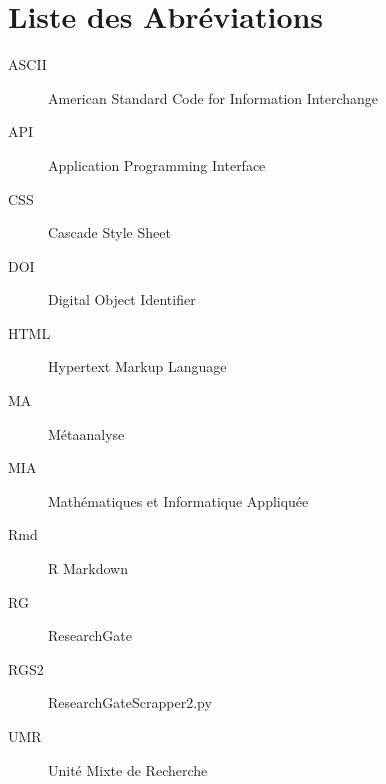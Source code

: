 \documentclass{book}
\begin{document}
\newpage
\mbox{} %


\newpage
{}
\chapter*{Liste des Abréviations}

\begin{description}
    \item[ASCII] American Standard Code for Information Interchange
    \item[API] Application Programming Interface
    \item[CSS] Cascade Style Sheet
    \item[DOI] Digital Object Identifier
    \item[HTML] Hypertext Markup Language
    \item[MA] Métaanalyse
    \item[MIA] Mathématiques et Informatique Appliquée
    \item[Rmd] R Markdown
    \item[RG] ResearchGate
    \item[RGS2] ResearchGateScrapper2.py
    \item[UMR] Unité Mixte de Recherche

\end{description}
\thispagestyle{fancy}


\newpage
\mbox{} %
\thispagestyle{fancy}


\newpage
{}
\end{document}
